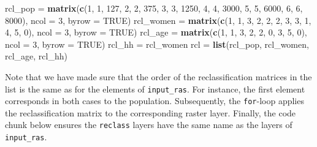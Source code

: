 \documentclass[]{krantz}
\newenvironment{Shaded}{\begin{snugshade}}{\end{snugshade}}
\newcommand{\DataTypeTok}[1]{\textcolor[rgb]{0.27,0.27,0.27}{#1}}
\newcommand{\DecValTok}[1]{\textcolor[rgb]{0.06,0.06,0.06}{#1}}
\newcommand{\KeywordTok}[1]{\textcolor[rgb]{0.27,0.27,0.27}{\textbf{#1}}}
\newcommand{\NormalTok}[1]{#1}
\newcommand{\OtherTok}[1]{\textcolor[rgb]{0.37,0.37,0.37}{#1}}
\newcommand{\StringTok}[1]{\textcolor[rgb]{0.5,0.5,0.5}{#1}}
\begin{document}
\begin{Shaded}
\begin{Highlighting}[]
\NormalTok{rcl_pop =}\StringTok{ }\KeywordTok{matrix}\NormalTok{(}\KeywordTok{c}\NormalTok{(}\DecValTok{1}\NormalTok{, }\DecValTok{1}\NormalTok{, }\DecValTok{127}\NormalTok{, }\DecValTok{2}\NormalTok{, }\DecValTok{2}\NormalTok{, }\DecValTok{375}\NormalTok{, }\DecValTok{3}\NormalTok{, }\DecValTok{3}\NormalTok{, }\DecValTok{1250}\NormalTok{, }
                   \DecValTok{4}\NormalTok{, }\DecValTok{4}\NormalTok{, }\DecValTok{3000}\NormalTok{, }\DecValTok{5}\NormalTok{, }\DecValTok{5}\NormalTok{, }\DecValTok{6000}\NormalTok{, }\DecValTok{6}\NormalTok{, }\DecValTok{6}\NormalTok{, }\DecValTok{8000}\NormalTok{), }
                 \DataTypeTok{ncol =} \DecValTok{3}\NormalTok{, }\DataTypeTok{byrow =} \OtherTok{TRUE}\NormalTok{)}
\NormalTok{rcl_women =}\StringTok{ }\KeywordTok{matrix}\NormalTok{(}\KeywordTok{c}\NormalTok{(}\DecValTok{1}\NormalTok{, }\DecValTok{1}\NormalTok{, }\DecValTok{3}\NormalTok{, }\DecValTok{2}\NormalTok{, }\DecValTok{2}\NormalTok{, }\DecValTok{2}\NormalTok{, }\DecValTok{3}\NormalTok{, }\DecValTok{3}\NormalTok{, }\DecValTok{1}\NormalTok{, }\DecValTok{4}\NormalTok{, }\DecValTok{5}\NormalTok{, }\DecValTok{0}\NormalTok{), }
                   \DataTypeTok{ncol =} \DecValTok{3}\NormalTok{, }\DataTypeTok{byrow =} \OtherTok{TRUE}\NormalTok{)}
\NormalTok{rcl_age =}\StringTok{ }\KeywordTok{matrix}\NormalTok{(}\KeywordTok{c}\NormalTok{(}\DecValTok{1}\NormalTok{, }\DecValTok{1}\NormalTok{, }\DecValTok{3}\NormalTok{, }\DecValTok{2}\NormalTok{, }\DecValTok{2}\NormalTok{, }\DecValTok{0}\NormalTok{, }\DecValTok{3}\NormalTok{, }\DecValTok{5}\NormalTok{, }\DecValTok{0}\NormalTok{),}
                 \DataTypeTok{ncol =} \DecValTok{3}\NormalTok{, }\DataTypeTok{byrow =} \OtherTok{TRUE}\NormalTok{)}
\NormalTok{rcl_hh =}\StringTok{ }\NormalTok{rcl_women}
\NormalTok{rcl =}\StringTok{ }\KeywordTok{list}\NormalTok{(rcl_pop, rcl_women, rcl_age, rcl_hh)}
\end{Highlighting}
\end{Shaded}

Note that we have made sure that the order of the reclassification matrices in the list is the same as for the elements of \texttt{input\_ras}.
For instance, the first element corresponds in both cases to the population.
Subsequently, the \texttt{for}-loop applies the reclassification matrix to the corresponding raster layer.
Finally, the code chunk below ensures the \texttt{reclass} layers have the same name as the layers of \texttt{input\_ras}.
\end{document}
